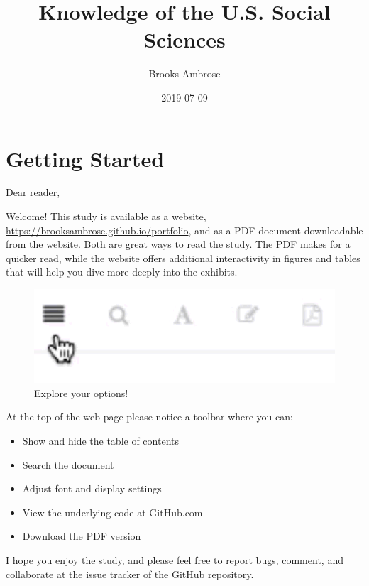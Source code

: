 \documentclass[]{book}
\title{Knowledge of the U.S. Social Sciences}
\author{Brooks Ambrose}
\date{2019-07-09}
\providecommand{\tightlist}{%
  \setlength{\itemsep}{0pt}\setlength{\parskip}{0pt}}
\theoremstyle{definition}
\theoremstyle{definition}
\theoremstyle{definition}
\theoremstyle{remark}
\begin{document}
\maketitle

{
\setcounter{tocdepth}{2}
\tableofcontents
}
\listoftables
\listoffigures
\hypertarget{getting-started}{%
\chapter*{Getting Started}\label{getting-started}}


Dear reader,

Welcome! This study is available as a website,
\url{https://brooksambrose.github.io/portfolio}, and as a PDF document
downloadable from the website. Both are great ways to read the study.
The PDF makes for a quicker read, while the website offers additional
interactivity in figures and tables that will help you dive more deeply
into the exhibits.

\begin{figure}

{\centering \includegraphics[width=6.94in]{img/toolbar} 

}

\caption{Explore your options!}\label{fig:toolbar}
\end{figure}

At the top of the web page please notice a toolbar where you can:

\begin{itemize}
\tightlist
\item
  Show and hide the table of contents
\item
  Search the document
\item
  Adjust font and display settings
\item
  View the underlying code at GitHub.com
\item
  Download the PDF version
\end{itemize}

I hope you enjoy the study, and please feel free to report bugs,
comment, and collaborate at the issue tracker of the GitHub repository.
\end{document}
